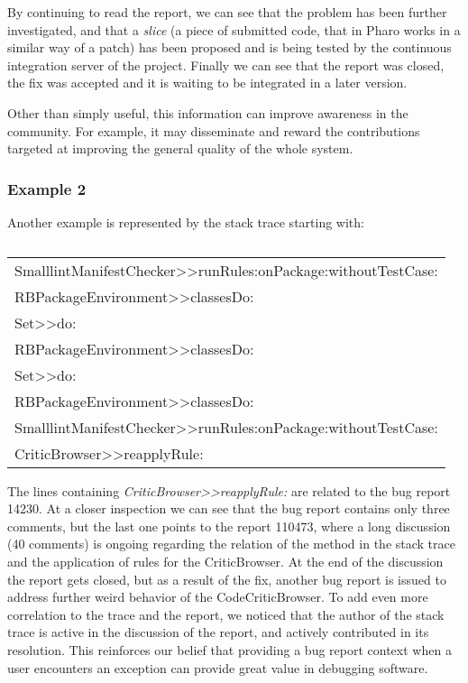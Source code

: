 By continuing to read the report, we can see that the problem has been further investigated, and that a \emph{slice} (a piece of submitted code, that in Pharo works in a similar way of a patch) has been proposed and is being tested by the continuous integration server of the project.
Finally we can see that the report was closed, the fix was accepted and it is waiting to be integrated in a later version.

Other than simply useful, this information can improve awareness in the community.
For example, it may disseminate and reward the contributions targeted at improving the general quality of the whole system.


\subsubsection{Example 2} Another example is represented by the stack trace starting with:

\begin{table}[h]
\centering
\caption{ }
{\footnotesize
\begin{tabular}{l}
SmalllintManifestChecker>>runRules:onPackage:withoutTestCase: \\
RBPackageEnvironment>>classesDo: \\
Set>>do: \\
RBPackageEnvironment>>classesDo: \\
Set>>do: \\
RBPackageEnvironment>>classesDo: \\
SmalllintManifestChecker>>runRules:onPackage:withoutTestCase: \\
CriticBrowser>>reapplyRule:
\end{tabular}}
\end{table}

The lines containing \emph{CriticBrowser{>}{>}reapplyRule:} are related to the bug report 14230.
At a closer inspection we can see that the bug report contains only three comments, but the last one points to the report 110473, where a long discussion (40 comments) is ongoing regarding the relation of the method in the stack trace and the application of rules for the CriticBrowser.
At the end of the discussion the report gets closed, but as a result of the fix, another bug report is issued to address further weird behavior of the CodeCriticBrowser.
To add even more correlation to the trace and the report, we noticed that the author of the stack trace is active in the discussion of the report, and actively contributed in its resolution.
This reinforces our belief that providing a bug report context when a user encounters an exception can provide great value in debugging software.




